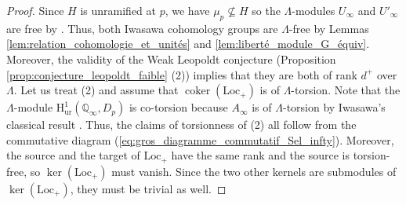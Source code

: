 \documentclass[12pt]{amsart}
\newcommand\bQ{\mathbb{Q}}
\newcommand{\Loc}{\mathrm{Loc}}
\DeclareMathOperator{\coker}{coker}
\newcommand{\HH}{\mathrm{H}}
\newcommand{\ur}{\mathrm{ur}}
\theoremstyle{defstyle}
\theoremstyle{thmstyle}
\begin{document}
\begin{proof}
 Since $H$ is unramified at $p$, we have $\mu_p \not\subseteq H$ so the $\Lambda$-modules $U_\infty$ and $U'_\infty$ are free by \cite[Théorème 1.5 and Corollaire 1.6]{belliard}. Thus, both Iwasawa cohomology groups are $\Lambda$-free by Lemmas \ref{lem:relation_cohomologie_et_unités} and \ref{lem:liberté_module_G_équiv}. Moreover, the validity of the Weak Leopoldt conjecture (Proposition \ref{prop:conjecture_leopoldt_faible} (2)) implies that they are both of rank $d^+$ over $\Lambda$. Let us treat (2) and assume that $\coker \left(\Loc_+\right)$ is of $\Lambda$-torsion. Note that the $\Lambda$-module $\HH^1_\ur(\bQ_\infty,D_p)$ is co-torsion because $A_\infty$ is of $\Lambda$-torsion by Iwasawa's classical result \cite{iwasawa1973zl}. Thus, the claims of torsionness of (2) all follow from the commutative diagram (\ref{eq:gros_diagramme_commutatif_Sel_infty}). Moreover, the source and the target of $\Loc_+$ have the same rank and the source is torsion-free, so $\ker \left(\Loc_+\right)$ must vanish. Since the two other kernels are submodules of $\ker \left(\Loc_+\right)$, they must be trivial as well. 
\end{proof}
\end{document}
